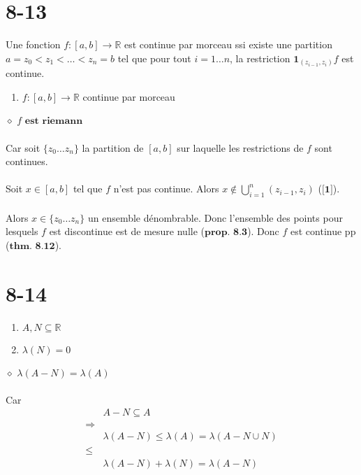 \documentclass[a4paper,10pt]{article}
\begin{document}
\section*{8-13}
Une fonction $f : [a,b] \rightarrow \mathbb{R}$ est continue par morceau ssi existe une partition
$a = z_0 < z_1 < \dots < z_n = b$ tel que pour tout $i = 1 \dots n$, la restriction $\textbf{1}_{(z_{i-1}, z_i)}f$ est continue.
\begin{enumerate}
 \item $f : [a,b] \rightarrow \mathbb{R}$ continue par morceau
\end{enumerate}
$\diamond$ $f \textbf{ est riemann}$
\\
\\
Car soit $\{z_0 \dots z_n\}$ la partition de $[a,b]$ sur laquelle les restrictions de $f$ sont continues. 
\\
\\
Soit $x \in [a,b]$ tel que $f$ n'est pas continue. Alors $x \not\in \bigcup\limits_{i=1}^n (z_{i-1}, z_i)$ ($\textbf{[1]}$).
\\
\\
Alors $x \in \{z_0 \dots z_n\}$ un ensemble dénombrable. Donc l'ensemble des points pour lesquels $f$ est discontinue
est de mesure nulle ($\textbf{prop. 8.3}$). Donc $f$ est continue pp ($\textbf{thm. 8.12}$).

\section*{8-14}
\begin{enumerate}
 \item $A, N \subseteq \mathbb{R}$
 \item $\lambda (N) = 0$
\end{enumerate}
$\diamond$ $\lambda(A-N) = \lambda(A)$
\\
\\
Car 
\begin{align*}
  & A - N \subseteq A \\
  \Rightarrow \\
  & \lambda(A-N) \leq \lambda(A) = \lambda(A - N \cup N) \\
  \leq \\
  & \lambda(A - N) + \lambda(N) = \lambda(A - N)
\end{align*}
\end{document}
